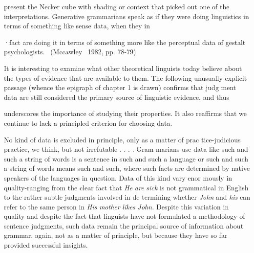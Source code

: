 \begin{styleStandard}
present the Necker cube with shading or context that picked out one of the interpretations. Generative grammarians speak as if they were doing linguistics in terms of something like sense data, when they in
\end{styleStandard}


\begin{styleStandard}
·fact are doing it in terms of something more like the perceptual data of gestalt psychologists. \ (Mccawley \ 1982, pp. 78-79)
\end{styleStandard}


\begin{styleStandard}
It is interesting to examine what other theoretical linguists today believe about the types of evidence that are available to them. The following unusually explicit passage (whence the epigraph of chapter 1 is drawn) confirms that judg\- ment data are still considered the primary source of linguistic evidence, and thus
\end{styleStandard}


\clearpage\setcounter{page}{1}\begin{styleTextbody}
underscores the importance of studying their properties. It also reaffirms that we continue to lack a principled criterion for choosing data.
\end{styleTextbody}


\begin{styleTextbody}
No kind of data is excluded in principle, only as a matter of prac\- tice-judicious practice, we think, but not irrefutable . . . . Gram\- marians use data like {\textquotedbl}such and such a string of words is a sentence in such and such a language{\textquotedbl} or {\textquotedbl}such and such a string of words means such and such,{\textquotedbl} where such facts are determined by native speakers of the languages in question. Data of this kind vary enor\- mously in quality-ranging from the clear fact that \textit{He}\textit{ }\textit{are}\textit{ }\textit{sick}\textit{ }is not grammatical in English to the rather subtle judgments involved in de\- termining whether \textit{John}\textit{ }and \textit{his}\textit{ }can refer to the same person in \textit{His}\textit{ }\textit{mother}\textit{ }\textit{likes}\textit{ }\textit{John.}\textit{ }Despite this variation in quality and despite the fact that linguists have not formulated a {\textquotedbl}methodology of sentence judgments,{\textquotedbl} such data remain the principal source of information about grammar, again, not as a matter of principle, but because they have so far provided successful insights.
\end{styleTextbody}


